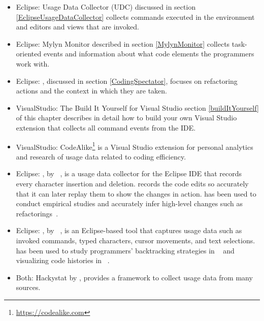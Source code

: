 \begin{itemize}

	\item[]Eclipse: Usage Data Collector (UDC) discussed in section \ref{EclipseUsageDataCollector} collects commands executed in the environment and editors and views that are invoked.
	
	\item[]Eclipse: Mylyn Monitor described in section \ref{MylynMonitor} collects task-oriented events and information about what code elements the programmers work with.
	
    \item[]Eclipse: \CodingSpectator %
, discussed in section \ref{CodingSpectator}, focuses on refactoring actions and the context in which they are taken.

	\item[]VisualStudio: The Build It Yourself for Visual Studio section \ref{buildItYourself} of this chapter describes in detail how to build your own Visual Studio extension that collects all command events from the IDE.



	\item[]VisualStudio: CodeAlike\footnote{\url{https://codealike.com}} is a Visual Studio extension for personal analytics and research of usage data related to coding efficiency. 

    \item[]Eclipse: \CodingTracker, by ~, is a usage data collector for the Eclipse IDE that records every character insertion and deletion. \CodingTracker{} records the code edits so accurately that it can later replay them to show the changes in action. \CodingTracker{} has been used to conduct empirical studies and accurately infer high-level changes such as refactorings~\cite{NegaraETAL2013ManualRefactorings}.

    \item[]Eclipse: \Fluorite, by ~, is an Eclipse-based tool that captures usage data such as invoked commands, typed characters, cursor movements, and text selections. \Fluorite{} has been used to study programmers' backtracking strategies in ~\cite{YoonMyers2012Backtracking} and visualizing code histories in ~\cite{YoonETAL2013VisualizeChange}.

	\item[]Both: Hackystat by , provides a framework to collect usage data from many sources.%
\end{itemize}

